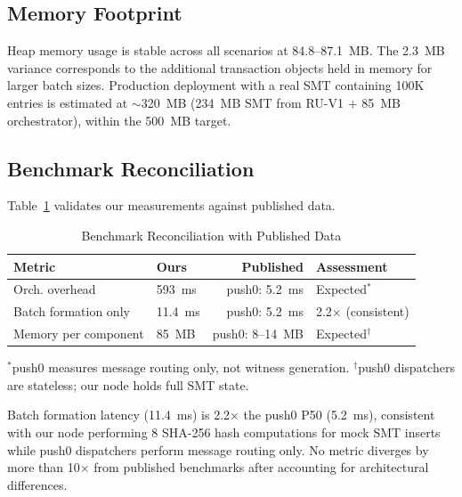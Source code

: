 \subsection{Memory Footprint}

Heap memory usage is stable across all scenarios at 84.8--87.1~MB. The
2.3~MB variance corresponds to the additional transaction objects held in
memory for larger batch sizes. Production deployment with a real SMT
containing 100K entries is estimated at $\sim$320~MB (234~MB SMT from
RU-V1 + 85~MB orchestrator), within the 500~MB target.

\subsection{Benchmark Reconciliation}

Table~\ref{tab:reconcile} validates our measurements against published data.

\begin{table}[htbp]
\centering
\caption{Benchmark Reconciliation with Published Data}
\label{tab:reconcile}
\begin{tabular}{llrl}
\toprule
\textbf{Metric} & \textbf{Ours} & \textbf{Published} & \textbf{Assessment} \\
\midrule
Orch. overhead       & 593~ms  & push0: 5.2~ms & Expected$^*$ \\
Batch formation only & 11.4~ms & push0: 5.2~ms & 2.2$\times$ (consistent) \\
Memory per component & 85~MB   & push0: 8--14~MB & Expected$^\dagger$ \\
\bottomrule
\end{tabular}
\begin{flushleft}
\small $^*$push0 measures message routing only, not witness generation.
$^\dagger$push0 dispatchers are stateless; our node holds full SMT state.
\end{flushleft}
\end{table}

Batch formation latency (11.4~ms) is 2.2$\times$ the push0 P50 (5.2~ms),
consistent with our node performing 8 SHA-256 hash computations for mock
SMT inserts while push0 dispatchers perform message routing only. No metric
diverges by more than 10$\times$ from published benchmarks after accounting
for architectural differences.
